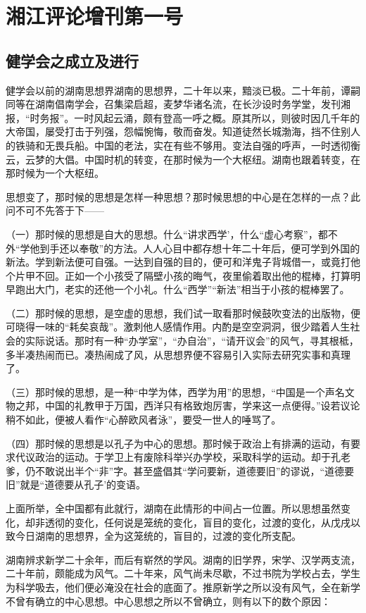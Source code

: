 \section{湘江评论增刊第一号}
\subsection{健学会之成立及进行}

健学会以前的湖南思想界湖南的思想界，二十年以来，黯淡已极。二十年前，谭嗣同等在湖南倡南学会，召集梁启超，麦梦华诸名流，在长沙设时务学堂，发刊湘报，“时务报”。一时风起云涌，颇有登高一呼之概。原其所以，则彼时因几千年的大帝国，屡受打击于列强，怨幅惋悔，敬而奋发。知道徒然长城渤海，挡不住别人的铁骑和无畏兵船。中国的老法，实在有些不够用。变法自强的呼声，一时透彻衡云，云梦的大倡。中国时机的转变，在那时候为一个大枢纽。湖南也跟着转变，在那时候为一个大枢纽。

思想变了，那时候的思想是怎样一种思想？那时候思想的中心是在怎样的一点？此问不可不先答于下——

（一）那时候的思想是自大的思想。什么“讲求西学’，什么“虚心考察”，都不外“学他到手还以奉敬”的方法。人人心目中都存想十年二十年后，便可学到外国的新法。学到新法便可自强。一达到自强的目的，便可和洋鬼子背城借一，或竟打他个片甲不回。正如一个小孩受了隔壁小孩的晦气，夜里偷着取出他的棍棒，打算明早跑出大门，老实的还他一个小礼。什么“西学”“新法”相当于小孩的棍棒罢了。

（二）那时候的思想，是空虚的思想，我们试一取看那时候鼓吹变法的出版物，便可晓得一味的“耗矣哀哉”。激刺他人感情作用。内酌是空空洞洞，很少踏着人生社会的实际说话。那时有一种“办学室”，“办自治”，“请开议会”的风气，寻其根柢，多半凑热闹而已。凑热闹成了风，从思想界便不容易引入实际去研究实事和真理了。

（三）那时候的思想，是一种“中学为体，西学为用”的思想，“中国是一个声名文物之邦，中国的礼教甲于万国，西洋只有格致炮厉害，学来这一点便得。”设若议论稍不如此，便被人看作“心醉欧风者泳”，要受一世人的唾骂了。

（四）那时候的思想是以孔子为中心的思想。那时候于政治上有排满的运动，有要求代议政治的运动。于学卫上有废除科举兴办学校，采取科学的运动。却于孔老爹，仍不敢说出半个“非”字。甚至盛倡其“学问要新，道德要旧”的谬说，“道德要旧”就是“道德要从孔子’的变语。

上面所举，全中国都有此就行，湖南在此情形的中间占一位置。所以思想虽然变化，却非透彻的变化，任何说是笼统的变化，盲目的变化，过渡的变化，从戊戌以致今日湖南的思想界，全为这笼统的，盲目的，过渡的变化所支配。

湖南辨求新学二十余年，而后有崭然的学风。湖南的旧学界，宋学、汉学两支流，二十年前，颇能成为风气。二十年来，风气尚未尽歇，不过书院为学校占去，学生为科学吸去，他们便必淹没在社会的底面了。推原新学之所以没有风气，全在新学不曾有确立的中心思想。中心思想之所以不曾确立，则有以下的数个原因：

